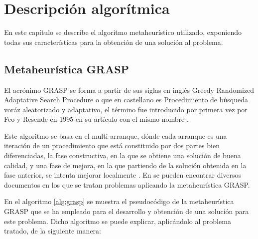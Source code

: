 
\chapter{Descripción algorítmica} %

\label{Chapter3}

En este capítulo se describe el algoritmo metaheurístico utilizado, exponiendo todas sus características para la obtención de una solución al problema.

\section{Metaheurística GRASP}
El acrónimo GRASP se forma a partir de sus siglas en inglés Greedy Randomized Adaptative Search Procedure o que en castellano es Procedimiento de búsqueda voráz aleatorizado y adaptativo, el término fue introducido por primera vez por Feo y Resende en 1995 en su artículo con el mismo nombre \cite{grasp-feo-resende}.

Este algoritmo se basa en el multi-arranque, dónde cada arranque es una iteración de un procedimiento que está constituido por dos partes bien diferenciadas, la fase constructiva, en la que se obtiene una solución de buena calidad, y una fase de mejora, en la que partiendo de la solución obtenida en la fase anterior, se intenta mejorar localmente \cite{libro-metaheuristicas}. 
En \cite{grasp-flightrecoveryproblem} \cite{grasp-parallel} \cite{grasp-weapon} \cite{grasp-empaquetado} \cite{grasp-ruta} \cite{grasp-vertex} se pueden encontrar diversos documentos en los que se tratan problemas aplicando la metaheurística GRASP.

En el algoritmo \ref{alg:grasp} se muestra el pseudocódigo de la metaheurística GRASP que se ha empleado para el desarrollo y obtención de una solución para este problema. Dicho algoritmo se puede explicar, aplicándolo al problema tratado, de la siguiente manera:\\

